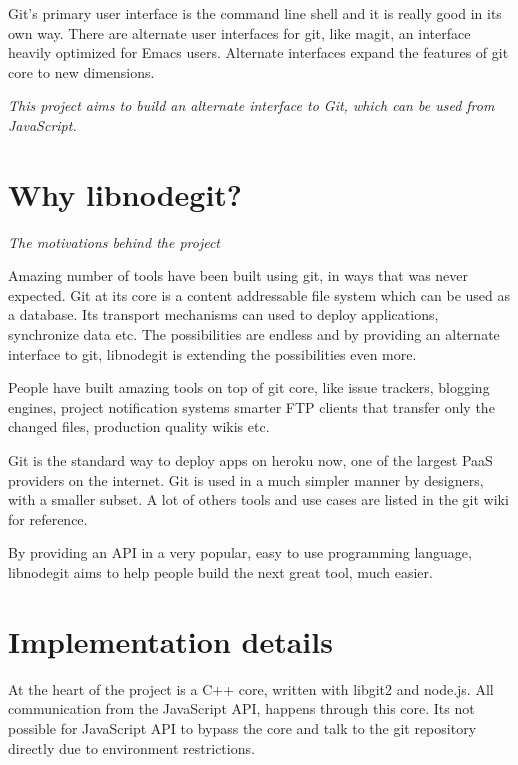 Git's primary user interface is the command line shell and it is really good in
its own way. There are alternate user interfaces for git, like
magit\cite{magit}, an interface heavily optimized for Emacs users. Alternate
interfaces expand the features of git core to new dimensions.

\emph{This project aims to build an alternate interface to Git, which can be
  used from JavaScript.}

\section{Why libnodegit?}

\newcommand\sectionTitle[1]{\begin{flushright}\textit{#1}\end{flushright}}
\sectionTitle{The motivations behind the project}

Amazing number of tools have been built using git, in ways that was never
expected. Git at its core is a content addressable file system which can be used
as a database. Its transport mechanisms can used to deploy applications,
synchronize data etc. The possibilities are endless and by providing an
alternate interface to git, libnodegit is extending the possibilities even more.

People have built amazing tools on top of git core, like issue
trackers\cite{gaskit}, blogging engines\cite{octopress}, project notification
systems\cite{git-dude} smarter FTP clients\cite{git-ftp} that transfer only the
changed files, production quality\cite{gollum-imporoved} wikis\cite{gollum} etc.

Git is the standard\cite{git-heroku} way to deploy apps on heroku\cite{heroku}
now, one of the largest PaaS\cite{PaaS} providers on the internet. Git is used
in a much simpler manner by designers\cite{git-designers}, with a smaller
subset. A lot of others tools and use cases are listed in the git
wiki\cite{git-tools} for reference.

By providing an API in a very popular, easy to use programming language,
libnodegit aims to help people build the next great tool, much easier.

\section{Implementation details}

At the heart of the project is a C++ core, written with libgit2\cite{libgit2}
and node.js\cite{node}. All communication from the JavaScript API, happens
through this core. Its not possible for JavaScript API to bypass the core and
talk to the git repository directly due to environment restrictions.

